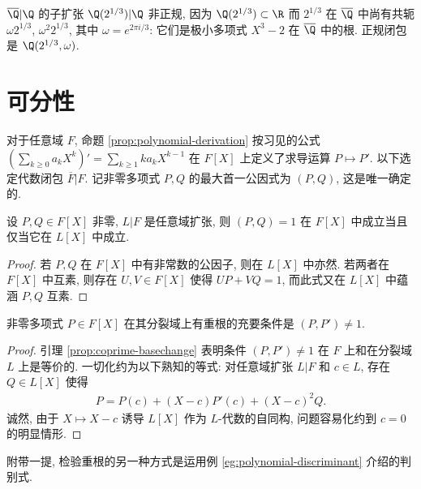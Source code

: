 \begin{example}\label{eg:x3-2-splitting}
	$\overline{\Q}|\Q$ 的子扩张 $\Q(2^{1/3})|\Q$ 非正规, 因为 $\Q(2^{1/3}) \subset \R$ 而 $2^{1/3}$ 在 $\overline{\Q}$ 中尚有共轭 $\omega 2^{1/3}$, $\omega^2 2^{1/3}$, 其中 $\omega = e^{2\pi i/3}$: 它们是极小多项式 $X^3 - 2$ 在 $\overline{\Q}$ 中的根. 正规闭包是 $\Q(2^{1/3},\omega)$.
\end{example}

\section{可分性}
对于任意域 $F$, 命题 \ref{prop:polynomial-derivation} 按习见的公式 $(\sum_{k \geq 0} a_k X^k)' = \sum_{k \geq 1} ka_k X^{k-1}$ 在 $F[X]$ 上定义了求导运算 $P \mapsto P'$. 以下选定代数闭包 $\overline{F}|F$. 记非零多项式 $P, Q$ 的最大首一公因式为 $(P, Q)$, 这是唯一确定的.

\begin{lemma}\label{prop:coprime-basechange}
	设 $P,Q \in F[X]$ 非零, $L|F$ 是任意域扩张, 则 $(P,Q)=1$ 在 $F[X]$ 中成立当且仅当它在 $L[X]$ 中成立.
\end{lemma}
\begin{proof}
	若 $P,Q$ 在 $F[X]$ 中有非常数的公因子, 则在 $L[X]$ 中亦然. 若两者在 $F[X]$ 中互素, 则存在 $U,V \in F[X]$ 使得 $UP+VQ=1$, 而此式又在 $L[X]$ 中蕴涵 $P,Q$ 互素.
\end{proof}

\begin{lemma}\label{prop:separable-polynomial-gen}
	非零多项式 $P \in F[X]$ 在其分裂域上有重根的充要条件是 $(P,P') \neq 1$.
\end{lemma}
\begin{proof}
	引理 \ref{prop:coprime-basechange} 表明条件 $(P, P') \neq 1$ 在 $F$ 上和在分裂域 $L$ 上是等价的. 一切化约为以下熟知的等式: 对任意域扩张 $L|F$ 和 $c \in L$, 存在 $Q \in L[X]$ 使得
	\begin{gather}\label{eqn:derivation-linear-approx}
		P = P(c) + (X-c) P'(c) + (X-c)^2 Q.
	\end{gather}
	诚然, 由于 $X \mapsto X-c$ 诱导 $L[X]$ 作为 $L$-代数的自同构, 问题容易化约到 $c=0$ 的明显情形.
\end{proof}
附带一提, 检验重根的另一种方式是运用例 \ref{eg:polynomial-discriminant} 介绍的判别式.

